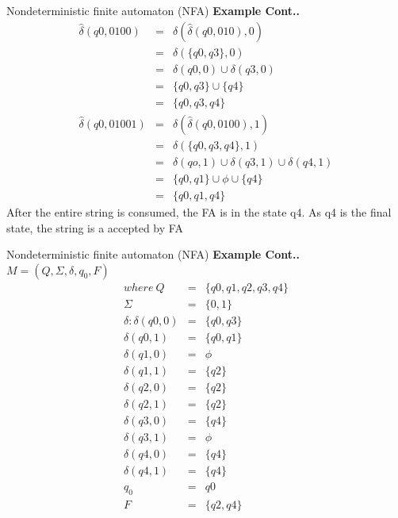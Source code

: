 \documentclass{beamer}
\begin{document}
\begin{frame}{Nondeterministic finite automaton (NFA)}
	\textbf{Example Cont..}\\
	\begin{eqnarray*}
			\hat{\delta}(q0,0100)&=&\delta(\hat{\delta}(q0,010),0)\\
								&=&\delta(\{q0,q3\},0)\\
								&=&\delta(q0,0)\cup \delta(q3,0)\\
								&=&\{q0,q3\}\cup \{q4\}\\
								&=&\{q0,q3,q4\}\\
			\hat{\delta}(q0,01001)&=&\delta(\hat{\delta}(q0,0100),1)\\
								&=&\delta(\{q0,q3,q4\},1)\\
								&=&\delta(qo,1)\cup\delta(q3,1)\cup\delta(q4,1)\\
								&=&\{q0,q1\}\cup\phi \cup \{q4\}\\
								&=&\{q0,q1,q4\}
	\end{eqnarray*}
After the entire string is consumed, the FA is in the state q4.
As q4 is the final state, the string is a accepted by FA
\end{frame}
\begin{frame}{Nondeterministic finite automaton (NFA)}
	\textbf{Example Cont..}\\
	$	M=(Q,\Sigma,\delta,q_0,F)$
	\tiny
	\begin{eqnarray*}
		where \  Q &=& \{q0, q1, q2, q3,q4\}\\
		\Sigma &=&  \{ 0,1 \}\\
		\delta:\delta(q0,0)&=&\{q0,q3\}\\
		\delta(q0,1)&=&\{q0,q1\}\\
		\delta(q1,0)&=&\phi\\
		\delta(q1,1)&=&\{q2\}\\
		\delta(q2,0)&=&\{q2\}\\
		\delta(q2,1)&=&\{q2\}\\
		\delta(q3,0)&=&\{q4\}\\
		\delta(q3,1)&=&\phi\\
		\delta(q4,0)&=&\{q4\}\\
		\delta(q4,1)&=&\{q4\}\\
		q_0 &=& q0\\
		F &=& \{ q2,q4\}
	\end{eqnarray*}
\end{frame}
\end{document}
